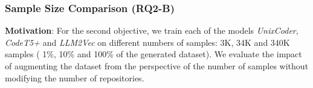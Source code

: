 \begin{table}[]



    \centering
    \caption{Fine-tuned models' scores on the evaluation applications. }
    \label{tab:ftscores_models}
\end{table}




\subsubsection{Sample Size Comparison (RQ2-B)}
\phantom{1}

\textbf{Motivation}: For the second objective, we train each of the models \textit{UnixCoder}, \textit{CodeT5+} and \textit{LLM2Vec} on different numbers of samples: 3K, 34K and 340K samples ( 1\%, 10\% and 100\% of the generated dataset). We evaluate the impact of augmenting the dataset from the perspective of the number of samples without modifying the number of repositories.


